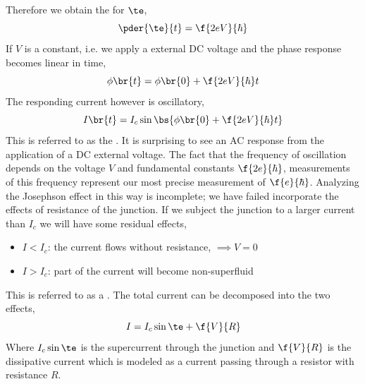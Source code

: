 \documentclass{article}
\begin{document}
Therefore we obtain the  for $\te$,
\[ \pder{\te}{t} = \f{2eV}{\hbar} \]
If $V$ is a constant, i.e. we apply a external DC voltage and the phase response becomes linear in time,
\[ \phi\br{t} = \phi\br{0} + \f{2eV}{\hbar}t \]
The responding current however is oscillatory,
\[ I\br{t} = I_c \sin \bs{\phi\br{0} + \f{2eV}{\hbar}t} \]
This is referred to as the . It is surprising to see an AC response from the application of a DC external voltage. The fact that the frequency of oscillation depends on the voltage $V$ and fundamental constants $\f{2e}{\hbar}$, measurements of this frequency represent our most precise measurement of $\f{e}{\hbar}$. Analyzing the Josephson effect in this way is incomplete; we have failed incorporate the effects of resistance of the junction. If we subject the junction to a larger current than $I_c$ we will have some residual effects,

\begin{itemize}
    \item $I < I_c$: the current flows without resistance, $\implies V = 0$
    \item $I > I_c$: part of the current will become non-superfluid
\end{itemize}
This is referred to as a . The total current can be decomposed into the two effects,
\[ I = I_c \sin \te + \f{V}{R} \]
Where $I_c\sin\te$ is the supercurrent through the junction and $\f{V}{R}$ is the dissipative current which is modeled as a current passing through a resistor with resistance $R$.\\
\end{document}
